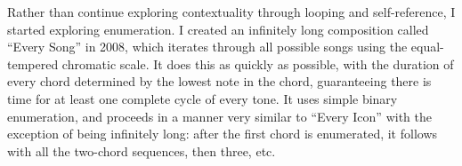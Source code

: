 \documentclass{thesis}
\begin{document}
Rather than continue exploring contextuality through looping and self-reference, I started exploring enumeration. I created an infinitely long composition called ``Every Song''\cite{kyle_mcdonald_every_2009} in 2008, which iterates through all possible songs using the equal-tempered chromatic scale. It does this as quickly as possible, with the duration of every chord determined by the lowest note in the chord, guaranteeing there is time for at least one complete cycle of every tone. It uses simple binary enumeration, and proceeds in a manner very similar to ``Every Icon'' with the exception of being infinitely long: after the first chord is enumerated, it follows with all the two-chord sequences, then three, etc.

\begin{figure}
  \begin{center}

\end{center}
\end{figure}
\end{document}
